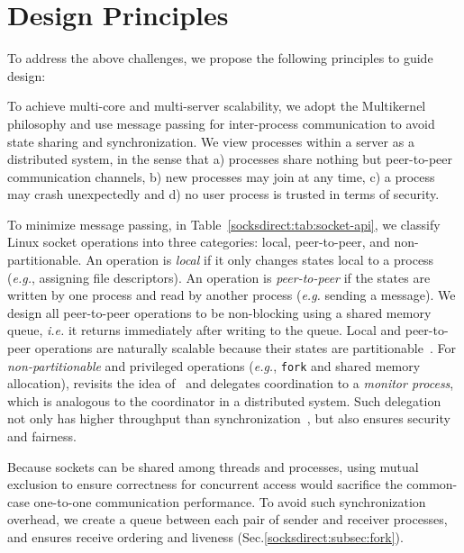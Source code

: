 \section{Design Principles}
\label{socksdirect:sec:architecture}

To address the above challenges, we propose the following principles to guide \sys design:

To achieve multi-core and multi-server scalability, we adopt the Multikernel~\cite{baumann2009multikernel} philosophy and use message passing for inter-process communication to avoid state sharing and synchronization. We view processes within a server as a distributed system, in the sense that a) processes share nothing but peer-to-peer communication channels, b) new processes may join at any time, c) a process may crash unexpectedly and d) no user process is trusted in terms of security. 

To minimize message passing, in Table~\ref{socksdirect:tab:socket-api}, we classify Linux socket operations into three categories: local, peer-to-peer, and non-partitionable. An operation is \textit{local} if it only changes states local to a process (\textit{e.g.}, assigning file descriptors). An operation is \textit{peer-to-peer} if the states are written by one process and read by another process (\textit{e.g.} sending a message).
We design all peer-to-peer operations to be non-blocking using a shared memory queue, \textit{i.e.} it returns immediately after writing to the queue. 
Local and peer-to-peer operations are naturally scalable because their states are partitionable~\cite{partitionable}. For \textit{non-partitionable} and privileged operations (\textit{e.g.}, \texttt{fork} and shared memory allocation), \sys revisits the idea of~\cite{hoare1974monitors} and delegates coordination to a \emph{monitor process}, which is analogous to the coordinator in a distributed system. Such delegation not only has higher throughput than synchronization~\cite{roghanchi2017ffwd}, but also ensures security and fairness.

Because sockets can be shared among threads and processes, using mutual exclusion to ensure correctness for concurrent access would sacrifice the common-case one-to-one communication performance. To avoid such synchronization overhead, we create a queue between each pair of sender and receiver processes, and ensures receive ordering and liveness (Sec.\ref{socksdirect:subsec:fork}).


